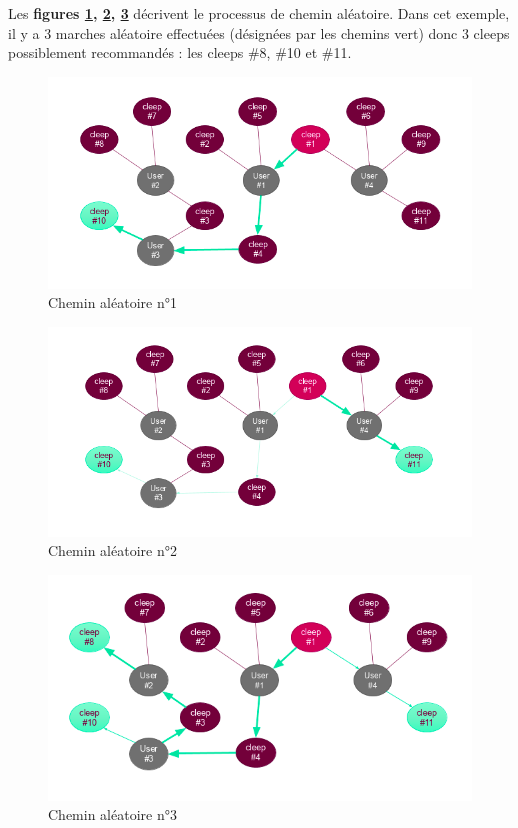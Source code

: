 \documentclass{article} %
\begin{document}
Les \textbf{figures \ref{fig:ex2}, \ref{fig:ex3}, \ref{fig:ex4}} décrivent le processus de chemin aléatoire. Dans cet exemple, il y a 3 marches aléatoire effectuées (désignées par les chemins vert) donc 3 cleeps possiblement recommandés : les cleeps \#8, \#10 et \#11.
\begin{figure}[!h]
	\centering
	\includegraphics[keepaspectratio = true,scale=0.6]{ex2}
	\caption{Chemin aléatoire n°1}
	\label{fig:ex2}
\end{figure}

\begin{figure}[!h]
	\centering
	\includegraphics[keepaspectratio = true,scale=0.6]{ex3}
	\caption{Chemin aléatoire n°2}
	\label{fig:ex3}
\end{figure}

\begin{figure}[!h]
	\centering
	\includegraphics[keepaspectratio = true,scale=0.6]{ex4}
	\caption{Chemin aléatoire n°3}
	\label{fig:ex4}
\end{figure}
\end{document}
